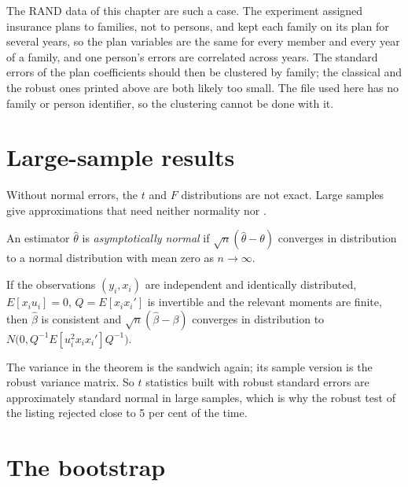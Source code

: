 The RAND data of this chapter are such a case. The experiment assigned insurance plans to families, not to persons, and
kept each family on its plan for several years, so the plan variables are the same for every member and every year of a
family, and one person's errors are correlated across years. The standard errors of the plan coefficients should then be
clustered by family; the classical and the robust ones printed above are both likely too small. The file used here has
no family or person identifier, so the clustering cannot be done with it.

\section{Large-sample results}\label{sec:b2:regression-inference:asymptotic}

Without normal errors, the $t$ and $F$ distributions are not exact. Large samples give approximations that need neither
normality nor .

\begin{definition}\label{def:b2:regression-inference:asymptotic-normality}
An estimator $\hat\theta$ is \emph{asymptotically normal} if $\sqrt n(\hat\theta - \theta)$
converges in distribution to a normal distribution with mean zero as $n \to \infty$.
\end{definition}

\begin{theorem}\label{thm:b2:regression-inference:asymptotic}
If the observations $(y_i, x_i)$ are independent and identically distributed, $E[x_iu_i] = 0$, $Q = E[x_ix_i']$ is
invertible and the relevant moments are finite, then $\hat\beta$ is consistent and $\sqrt n(\hat\beta - \beta)$ converges
in distribution to $N\bigl(0, Q^{-1}E[u_i^2x_ix_i']Q^{-1}\bigr)$.
\end{theorem}
\admitted

The variance in the theorem is the sandwich again; its sample version is the robust variance matrix. So $t$ statistics
built with robust standard errors are approximately standard normal in large samples, which is why the robust test of the
listing rejected close to 5 per cent of the time.

\section{The bootstrap}\label{sec:b2:regression-inference:bootstrap}

